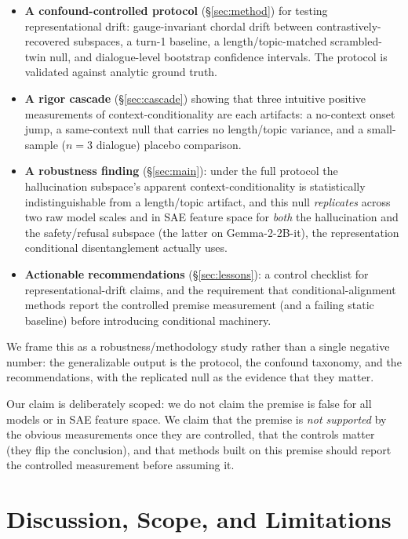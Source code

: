 \documentclass{article}
\begin{document}
\begin{itemize}
\item \textbf{A confound-controlled protocol} (\S\ref{sec:method}) for testing
representational drift: gauge-invariant chordal drift between contrastively-recovered
subspaces, a turn-1 baseline, a length/topic-matched scrambled-twin null, and
dialogue-level bootstrap confidence intervals. The protocol is validated against analytic
ground truth.
\item \textbf{A rigor cascade} (\S\ref{sec:cascade}) showing that three intuitive
positive measurements of context-conditionality are each artifacts: a no-context onset
jump, a same-context null that carries no length/topic variance, and a small-sample
($n{=}3$ dialogue) placebo comparison.
\item \textbf{A robustness finding} (\S\ref{sec:main}): under the full protocol the
hallucination subspace's apparent context-conditionality is statistically indistinguishable
from a length/topic artifact, and this null \emph{replicates} across two raw model scales and in
SAE feature space for \emph{both} the hallucination and the safety/refusal subspace (the latter
on Gemma-2-2B-it), the representation conditional disentanglement actually uses.
\item \textbf{Actionable recommendations} (\S\ref{sec:lessons}): a control checklist for
representational-drift claims, and the requirement that conditional-alignment methods report
the controlled premise measurement (and a failing static baseline) before introducing
conditional machinery.
\end{itemize}

We frame this as a robustness/methodology study rather than a single negative number: the
generalizable output is the protocol, the confound taxonomy, and the recommendations, with
the replicated null as the evidence that they matter.

Our claim is deliberately scoped: we do not claim the premise is false for all models or
in SAE feature space. We claim that the premise is \emph{not supported} by the obvious
measurements once they are controlled, that the controls matter (they flip the
conclusion), and that methods built on this premise should report the controlled
measurement before assuming it.







\section{Discussion, Scope, and Limitations}
\label{sec:limits}
\end{document}

